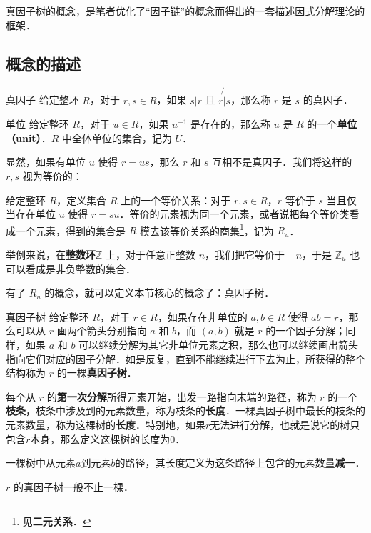 

真因子树的概念，是笔者优化了“因子链”的概念而得出的一套描述因式分解理论的框架．

\subsection{概念的描述}

\begin{definition}{真因子}
给定整环 $R$，对于 $r, s\in R$，如果 $s|r$ 且 $r\not{|}s$，那么称 $r$ 是 $s$ 的真因子．
\end{definition}

\begin{definition}{单位}
给定整环 $R$，对于 $u\in R$，如果 $u^{-1}$ 是存在的，那么称 $u$ 是 $R$ 的一个\textbf{单位（unit）}．$R$ 中全体单位的集合，记为 $U$．
\end{definition}

显然，如果有单位 $u$ 使得 $r=us$，那么 $r$ 和 $s$ 互相不是真因子．我们将这样的 $r, s$ 视为等价的：

\begin{definition}{}
给定整环 $R$，定义集合 $R$ 上的一个等价关系：对于 $r, s\in R$，$r$ 等价于 $s$ 当且仅当存在单位 $u$ 使得 $r=su$．等价的元素视为同一个元素，或者说把每个等价类看成一个元素，得到的集合是 $R$ 模去该等价关系的商集\footnote{见\textbf{二元关系}．}，记为 $R_u$．
\end{definition}

举例来说，在\textbf{整数环}$\mathbb{Z}$ 上，对于任意正整数 $n$，我们把它等价于 $-n$，于是 $\mathbb{Z}_u$ 也可以看成是非负整数的集合．

有了 $R_u$ 的概念，就可以定义本节核心的概念了：真因子树．

\begin{definition}{真因子树}
给定整环 $R$，对于 $r\in R$，如果存在非单位的 $a, b\in R$ 使得 $ab=r$，那么可以从 $r$ 画两个箭头分别指向 $a$ 和 $b$，而 $(a, b)$ 就是 $r$ 的一个因子分解；同样，如果 $a$ 和 $b$ 可以继续分解为其它非单位元素之积，那么也可以继续画出箭头指向它们对应的因子分解．如是反复，直到不能继续进行下去为止，所获得的整个结构称为 $r$ 的一棵\textbf{真因子树}．

每个从 $r$ 的\textbf{第一次分解}所得元素开始，出发一路指向末端的路径，称为 $r$ 的一个\textbf{枝条}，枝条中涉及到的元素数量，称为枝条的\textbf{长度}．一棵真因子树中最长的枝条的元素数量，称为这棵树的\textbf{长度}．特别地，如果$r$无法进行分解，也就是说它的树只包含$r$本身，那么定义这棵树的长度为$0$．

一棵树中从元素$a$到元素$b$的路径，其长度定义为这条路径上包含的元素数量\textbf{减一}．

$r$ 的真因子树一般不止一棵．
\end{definition}

